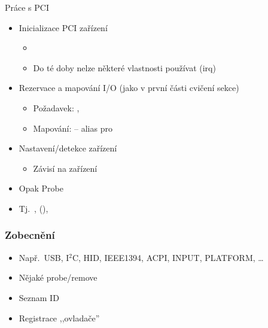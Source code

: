 \begin{frame}{Práce s PCI}

  \begin{itemize}
    \item Inicializace PCI zařízení
    \begin{itemize}
      \item {}
      \item Do té doby nelze některé vlastnosti  používat
        (irq)
    \end{itemize}

    \pause

    \item Rezervace a mapování I/O (jako v první části \iffimuni cvičení\else
      sekce\fi)
    \begin{itemize}
      \item Požadavek: , 

      \pause

      \item Mapování:  -- alias pro
    \end{itemize}

    \pause

    \item Nastavení/detekce zařízení
      \begin{itemize}
	\item Závisí na zařízení
      \end{itemize}
  \end{itemize}

  \pause
  \medskip

  \begin{itemize}
    \item Opak Probe
    \item Tj.\ , (),
  \end{itemize}

\end{frame}


\begin{frame}
  \frametitle{Zobecnění}

  \begin{itemize}
    \item Např.\ USB, I$^2$C, HID, IEEE1394, ACPI, INPUT, PLATFORM, \dots
    \item Nějaké probe/remove
    \item Seznam ID
    \item Registrace ,,ovladače''
  \end{itemize}

\end{frame}

